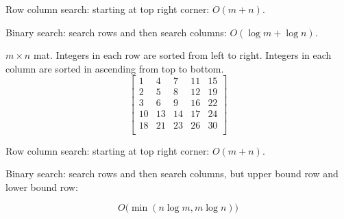 Row column search: starting at top right corner: $O(m+n)$.

Binary search: search rows and then search columns: $O(\log m + \log n)$.


 $m\times n$ mat. Integers in each row are sorted from
left to right. Integers in each column are sorted in ascending from top to bottom.
$$
\begin{bmatrix}
1&   4&  7& 11& 15 \\
2&   5&  8& 12& 19 \\
3&   6&  9& 16& 22 \\
10& 13& 14& 17& 24 \\
18& 21& 23& 26& 30 \\
\end{bmatrix}
$$ 

Row column search: starting at top right corner: $O(m+n)$.

Binary search: search rows and then search columns, but upper bound row and lower bound row: 

$$O\big(\min(n\log m, m\log n)\big)$$
